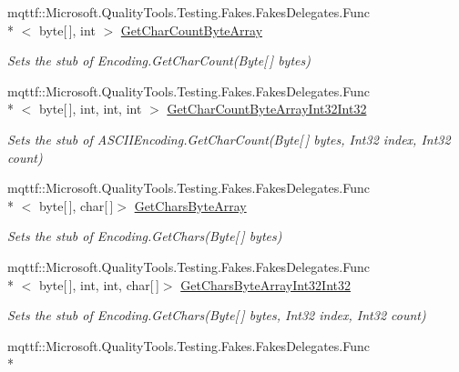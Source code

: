 \begin{DoxyCompactItemize}
mqttf\-::\-Microsoft.\-Quality\-Tools.\-Testing.\-Fakes.\-Fakes\-Delegates.\-Func\\*
$<$ byte\mbox{[}$\,$\mbox{]}, int $>$ \hyperlink{class_system_1_1_text_1_1_fakes_1_1_stub_a_s_c_i_i_encoding_ad910ff830f6a6e2d0463732c63811c65}{Get\-Char\-Count\-Byte\-Array}
\begin{DoxyCompactList}\small\item\em Sets the stub of Encoding.\-Get\-Char\-Count(\-Byte\mbox{[}$\,$\mbox{]} bytes)\end{DoxyCompactList}\item 
mqttf\-::\-Microsoft.\-Quality\-Tools.\-Testing.\-Fakes.\-Fakes\-Delegates.\-Func\\*
$<$ byte\mbox{[}$\,$\mbox{]}, int, int, int $>$ \hyperlink{class_system_1_1_text_1_1_fakes_1_1_stub_a_s_c_i_i_encoding_a5ab4c2eb27806f71a43f5c1f71556835}{Get\-Char\-Count\-Byte\-Array\-Int32\-Int32}
\begin{DoxyCompactList}\small\item\em Sets the stub of A\-S\-C\-I\-I\-Encoding.\-Get\-Char\-Count(\-Byte\mbox{[}$\,$\mbox{]} bytes, Int32 index, Int32 count)\end{DoxyCompactList}\item 
mqttf\-::\-Microsoft.\-Quality\-Tools.\-Testing.\-Fakes.\-Fakes\-Delegates.\-Func\\*
$<$ byte\mbox{[}$\,$\mbox{]}, char\mbox{[}$\,$\mbox{]}$>$ \hyperlink{class_system_1_1_text_1_1_fakes_1_1_stub_a_s_c_i_i_encoding_ac64c05b29926c1d5bad0355b1eb2b35b}{Get\-Chars\-Byte\-Array}
\begin{DoxyCompactList}\small\item\em Sets the stub of Encoding.\-Get\-Chars(\-Byte\mbox{[}$\,$\mbox{]} bytes)\end{DoxyCompactList}\item 
mqttf\-::\-Microsoft.\-Quality\-Tools.\-Testing.\-Fakes.\-Fakes\-Delegates.\-Func\\*
$<$ byte\mbox{[}$\,$\mbox{]}, int, int, char\mbox{[}$\,$\mbox{]}$>$ \hyperlink{class_system_1_1_text_1_1_fakes_1_1_stub_a_s_c_i_i_encoding_afc90e63f2e71a24df2e4c010a32206fb}{Get\-Chars\-Byte\-Array\-Int32\-Int32}
\begin{DoxyCompactList}\small\item\em Sets the stub of Encoding.\-Get\-Chars(\-Byte\mbox{[}$\,$\mbox{]} bytes, Int32 index, Int32 count)\end{DoxyCompactList}\item 
mqttf\-::\-Microsoft.\-Quality\-Tools.\-Testing.\-Fakes.\-Fakes\-Delegates.\-Func\\*

\end{DoxyCompactItemize}
